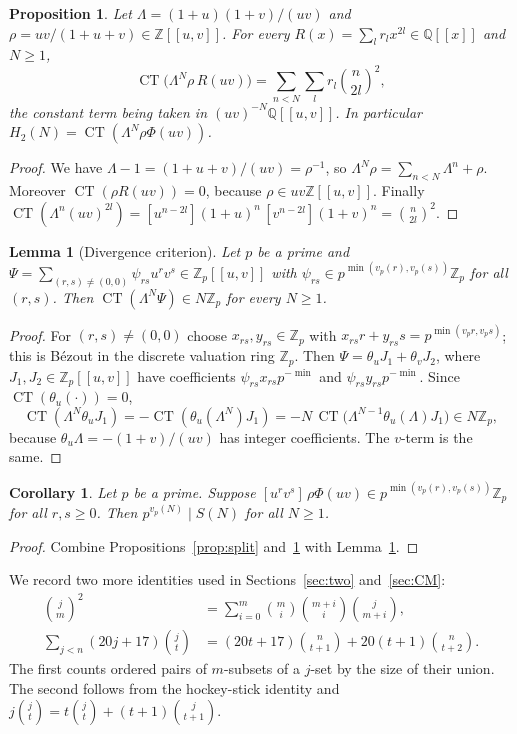 \documentclass[11pt]{amsart}
\newtheorem{lemma}[theorem]{Lemma}
\newtheorem{proposition}[theorem]{Proposition}
\newtheorem{corollary}[theorem]{Corollary}
\theoremstyle{definition}
\theoremstyle{remark}
\newcommand{\Z}{\mathbb{Z}}
\newcommand{\Q}{\mathbb{Q}}
\newcommand{\Zp}{\mathbb{Z}_p}
\newcommand{\CT}{\operatorname{CT}}
\begin{document}
\begin{proposition}\label{prop:CT}
Let $\Lambda=(1+u)(1+v)/(uv)$ and $\rho=uv/(1+u+v)\in\Z[[u,v]]$. For every
$R(x)=\sum_lr_lx^{2l}\in\Q[[x]]$ and $N\ge1$,
\[
 \CT\bigl(\Lambda^N\rho\,R(uv)\bigr)=\sum_{n<N}\sum_lr_l\binom n{2l}^2 ,
\]
the constant term being taken in $(uv)^{-N}\Q[[u,v]]$. In particular
$H_2(N)=\CT(\Lambda^N\rho\Phi(uv))$.
\end{proposition}
\begin{proof}
We have $\Lambda-1=(1+u+v)/(uv)=\rho^{-1}$, so $\Lambda^N\rho=\sum_{n<N}\Lambda^n+\rho$.
Moreover $\CT(\rho R(uv))=0$, because $\rho\in uv\Z[[u,v]]$. Finally
$\CT(\Lambda^n(uv)^{2l})=[u^{n-2l}](1+u)^n\,[v^{n-2l}](1+v)^n=\binom n{2l}^2$.
\end{proof}

\begin{lemma}[Divergence criterion]\label{lem:divergence}
Let $p$ be a prime and $\Psi=\sum_{(r,s)\neq(0,0)}\psi_{rs}u^rv^s\in\Zp[[u,v]]$ with
$\psi_{rs}\in p^{\min(v_p(r),v_p(s))}\Zp$ for all $(r,s)$. Then $\CT(\Lambda^N\Psi)\in N\Zp$ for every $N\ge1$.
\end{lemma}
\begin{proof}
For $(r,s)\ne(0,0)$ choose $x_{rs},y_{rs}\in\Zp$ with
$x_{rs}r+y_{rs}s=p^{\min(v_p r,v_p s)}$; this is B\'ezout in the discrete valuation ring $\Zp$.
Then $\Psi=\theta_uJ_1+\theta_vJ_2$, where $J_1,J_2\in\Zp[[u,v]]$ have coefficients
$\psi_{rs}x_{rs}p^{-\min}$ and $\psi_{rs}y_{rs}p^{-\min}$. Since $\CT(\theta_u(\cdot))=0$,
\[
\CT(\Lambda^N\theta_uJ_1)=-\CT(\theta_u(\Lambda^N)J_1)=-N\,\CT\bigl(\Lambda^{N-1}\theta_u(\Lambda)J_1\bigr)\in N\Zp,
\]
because $\theta_u\Lambda=-(1+v)/(uv)$ has integer coefficients. The $v$-term is the same.
\end{proof}

\begin{corollary}\label{cor:criterion}
Let $p$ be a prime. Suppose
$[u^rv^s]\,\rho\Phi(uv)\in p^{\min(v_p(r),v_p(s))}\Zp$ for all $r,s\ge0$. Then
$p^{v_p(N)}\mid S(N)$ for all $N\ge1$.
\end{corollary}
\begin{proof}
Combine Propositions~\ref{prop:split} and~\ref{prop:CT} with Lemma~\ref{lem:divergence}.
\end{proof}

We record two more identities used in Sections~\ref{sec:two} and~\ref{sec:CM}:
\begin{align}
 \binom jm^2&=\sum_{i=0}^m\binom mi\binom{m+i}i\binom j{m+i},\label{eq:product}\\
 \sum_{j<n}(20j+17)\binom jt&=(20t+17)\binom n{t+1}+20(t+1)\binom n{t+2}.\label{eq:hockey}
\end{align}
The first counts ordered pairs of $m$-subsets of a $j$-set by the size of their union. The second
follows from the hockey-stick identity and $j\binom jt=t\binom jt+(t+1)\binom j{t+1}$.
\end{document}
